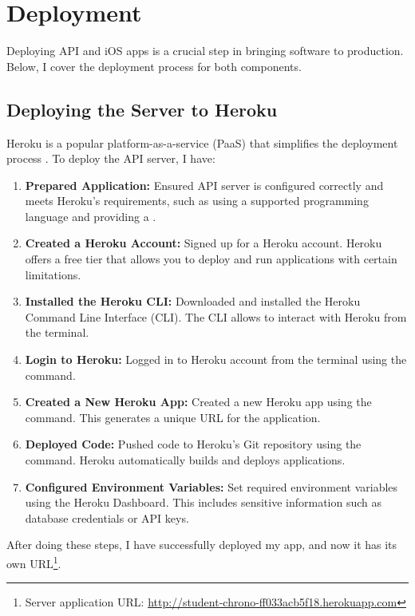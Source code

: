 \documentclass[
  biblatex = false,
  language=english,
  figures=false,
  sourcecodes,
  glossaries,
  index
]{kidiplom}
\begin{document}
\section{Deployment}

Deploying API and iOS apps is a crucial step in bringing software to production. Below, I cover the deployment process for both components.

\subsection{Deploying the Server to Heroku}

Heroku is a popular platform-as-a-service (PaaS) that simplifies the deployment process \cite{bib9}. To deploy the API server, I have:

\begin{enumerate}
    \item \textbf{Prepared Application:} Ensured API server is configured correctly and meets Heroku's requirements, such as using a supported programming language and providing a .
    \item \textbf{Created a Heroku Account:} Signed up for a Heroku account. Heroku offers a free tier that allows you to deploy and run applications with certain limitations.
    \item \textbf{Installed the Heroku CLI:} Downloaded and installed the Heroku Command Line Interface (CLI). The CLI allows to interact with Heroku from the terminal.
    \item \textbf{Login to Heroku:} Logged in to Heroku account from the terminal using the  command.
    \item \textbf{Created a New Heroku App:} Created a new Heroku app using the  command. This generates a unique URL for the application.
    \item \textbf{Deployed Code:} Pushed code to Heroku's Git repository using the  command. Heroku automatically builds and deploys applications.
    
    \item \textbf{Configured Environment Variables:} Set required environment variables using the Heroku Dashboard. This includes sensitive information such as database credentials or API keys.
\end{enumerate}
After doing these steps, I have successfully deployed my app, and now it has its own URL\footnote{Server application URL: \url{http://student-chrono-ff033acb5f18.herokuapp.com}}.
\end{document}
